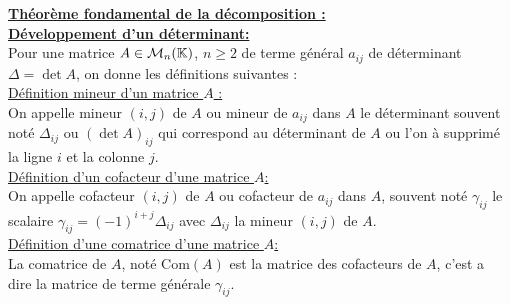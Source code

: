 \textbf{\underline{Théorème fondamental de la décomposition :}}\\
\textbf{\underline{Développement d'un déterminant:}}\\
Pour une matrice $A\in\mathcal{M}_n(\mathbb{K})$, $n\geq2$ de terme général $a_{ij}$ de déterminant $\Delta=\det A$, on donne les définitions suivantes :\\

\underline{Définition mineur d'un matrice $A$ :}\\
On appelle mineur $(i,j)$ de $A$ ou mineur de $a_{ij}$ dans $A$ le déterminant souvent noté $\Delta_{ij}$ ou $(\det A)_{ij}$ qui correspond au déterminant de $A$ ou l'on à supprimé la ligne $i$ et la colonne $j$.\\

\underline{Définition d'un cofacteur d'une matrice $A$:}\\
On appelle cofacteur $(i,j)$ de $A$ ou  cofacteur de $a_{ij}$ dans $A$, souvent noté $\gamma_{ij}$ le scalaire  $\gamma_{ij}=(-1)^{i+j}\Delta_{ij}$ avec $\Delta_{ij}$ la mineur $(i,j)$ de $A$.\\

\underline{Définition d'une comatrice d'une matrice $A$:}\\
La comatrice de $A$, noté $\text{Com}(A)$ est la matrice des cofacteurs de $A$, c'est a dire la matrice de terme générale $\gamma_{ij}$.\\

